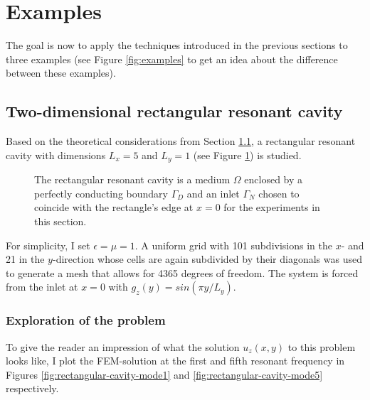 \documentclass[11pt, a4paper]{article}
\begin{document}
\newpage
\section{Examples}
\label{sec:examples}

The goal is now to apply the techniques introduced in the previous sections
to three examples (see Figure \ref{fig:examples} to get an idea about the
difference between these examples).

\subsection{Two-dimensional rectangular resonant cavity}
\label{subsec:examples-rectangularcavity}

Based on the theoretical considerations from Section \ref{subsec:examples-rectangularcavity},
a rectangular resonant cavity with dimensions $L_x=5$ and $L_y=1$ (see Figure 
\ref{fig:rectangular_cavity}) is studied.
\begin{figure}[h]
    \centering
    
    \caption{The rectangular resonant cavity is a medium $\Omega$ enclosed
    by a perfectly conducting boundary $\Gamma_D$ and an inlet $\Gamma_N$
    chosen to coincide with the rectangle's edge at $x=0$ for the experiments in this
    section.}
    \label{fig:rectangular_cavity}
\end{figure}

For simplicity, I set $\epsilon=\mu=1$. A uniform grid with 101 subdivisions in
the $x$- and 21 in the $y$-direction whose cells are again subdivided by their
diagonals was used to generate a mesh that allows for 4365 degrees of freedom.
The system is forced from the inlet at $x=0$ with $g_z(y) = sin(\pi y / L_y)$.

\subsubsection{Exploration of the problem}
\label{subsubsec:exploration}

To give the reader an impression of what the solution $u_z(x, y)$ to this problem
looks like, I plot the \acrshort{FEM}-solution at the first and fifth resonant
frequency in Figures \ref{fig:rectangular-cavity-mode1} and \ref{fig:rectangular-cavity-mode5}
respectively.
\end{document}
